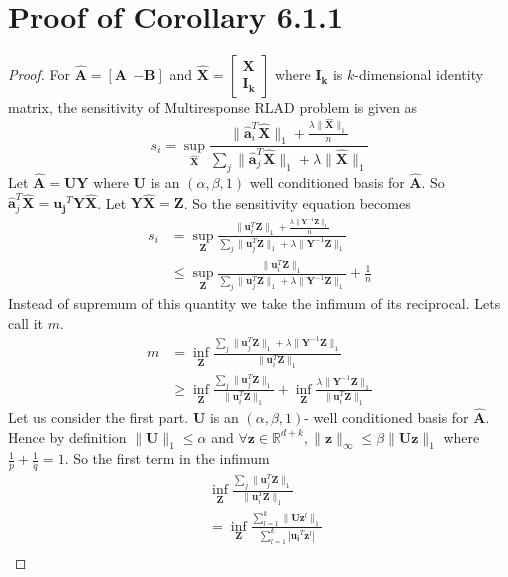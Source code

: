 \documentclass{article}
\newcommand{\M}{\mathbf}
\begin{document}
\section*{Proof of Corollary 6.1.1}
\begin{proof}
For $\hat{\M{A}}= [\M{A} ~~ \M{-B}]$ and $\hat{\M{X}}=\begin{bmatrix} \mathbf{X}\\ \M{I_k} \end{bmatrix}$ where $\M{I_k}$ is $k$-dimensional identity matrix, the sensitivity of Multiresponse RLAD problem is given as 
\begin{equation*}s_i=\sup_{\hat{\M{X}}}  \frac{\|\hat{\M{a}}_i^T\hat{\M{X}}\|_1 + \frac{\lambda\|\hat{\M{X}}\|_1}{n}}{ \sum_{j}\|\hat{\M{a}}_j^T\hat{\M{X}}\|_1 +\lambda\|\hat{\M{X}}\|_1}
\end{equation*}
Let $\hat{\M{A}}=\M{UY}$ where $\M{U}$ is an $(\alpha,\beta,1)$ well conditioned basis for $\hat{\M{A}}$. So $\hat{\M{a}}_j^T\hat{\M{X}}=\M{u_j}^T\M{Y}\hat{\M{X}}$. Let $\M{Y}\hat{\M{X}}=\M{Z}$. So the sensitivity equation becomes
\begin{eqnarray*}
   s_i&=\sup_{\M{Z}}  \frac{\|{\M{u}}_i^T{\M{Z}}\|_1 + \frac{\lambda\|{\M{Y}^{-1}\M{Z}}\|_1}{n}}{ \sum_{j}\|{\M{u}}_j^T{\M{Z}}\|_1 +\lambda\|{\M{Y}^{-1}\M{Z}}\|_1}\\
   &\leq \sup_{\M{Z}} \frac{\|{\M{u}}_i^T{\M{Z}}\|_1}{\sum_{j}\|{\M{u}}_j^T{\M{Z}}\|_1 +\lambda\|{\M{Y}^{-1}\M{Z}}\|_1} + \frac{1}{n}
\end{eqnarray*} 
Instead of supremum of this quantity we take the infimum of its reciprocal. Lets call it $m$.
\begin{eqnarray*}
m&=\inf_{\M{Z}} \frac{\sum_{j}\|{\M{u}}_j^T{\M{Z}}\|_1 +\lambda\|{\M{Y}^{-1}\M{Z}}\|_1}{\|{\M{u}}_i^T{\M{Z}}\|_1} \\
& \geq \inf_{\M{Z}}\frac{\sum_{j}\|{\M{u}}_j^T{\M{Z}}\|_1}{\|{\M{u}}_i^T{\M{Z}}\|_1} + \inf_{\M{Z}}\frac{\lambda\|{\M{Y}^{-1}\M{Z}}\|_1}{\|{\M{u}}_i^T{\M{Z}}\|_1}
\end{eqnarray*}
Let us consider the first part. $\M{U}$ is an $(\alpha,\beta,1)$- well conditioned basis for $\hat{\M{A}}$. Hence by definition $\|\M{U}\|_1 \leq \alpha$ and $\forall \M{z} \in \mathbb{R}^{d+k}, \|\M{z}\|_\infty  \leq \beta \|\M{U}\M{z}\|_1 $ where $\frac{1}{p}+\frac{1}{q}=1$. So the first term in the infimum
\begin{align*}
    &\inf_{\M{Z}}\frac{\sum_{j}\|{\M{u}}_j^T{\M{Z}}\|_1}{\|{\M{u}}_i^T{\M{Z}}\|_1}\\
    &= \inf_{\M{Z}}\frac{\sum_{l=1}^{k}{\|\M{U}\M{z}^l\|_1}}{\sum_{l=1}^{k}|\M{u_i}^T\M{z}^l|}\\

\end{align*}
\end{proof}
\end{document}
